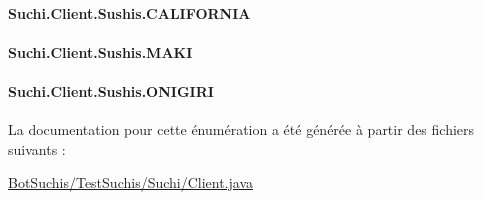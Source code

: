 \paragraph[{C\+A\+L\+I\+F\+O\+R\+N\+I\+A}]{\setlength{\rightskip}{0pt plus 5cm}Suchi.\+Client.\+Sushis.\+C\+A\+L\+I\+F\+O\+R\+N\+I\+A}\label{enumSuchi_1_1Client_1_1Sushis_a9143ca8f57e2209fed5ef8d45b45f4ed}
\hypertarget{enumSuchi_1_1Client_1_1Sushis_a7f9304fc608c42b727f2da248760fbc5}{}
\paragraph[{M\+A\+K\+I}]{\setlength{\rightskip}{0pt plus 5cm}Suchi.\+Client.\+Sushis.\+M\+A\+K\+I}\label{enumSuchi_1_1Client_1_1Sushis_a7f9304fc608c42b727f2da248760fbc5}
\hypertarget{enumSuchi_1_1Client_1_1Sushis_a5a4bebaf5f6bb0b133ded82613768474}{}
\paragraph[{O\+N\+I\+G\+I\+R\+I}]{\setlength{\rightskip}{0pt plus 5cm}Suchi.\+Client.\+Sushis.\+O\+N\+I\+G\+I\+R\+I}\label{enumSuchi_1_1Client_1_1Sushis_a5a4bebaf5f6bb0b133ded82613768474}


La documentation pour cette énumération a été générée à partir des fichiers suivants \+:\begin{DoxyCompactItemize}
\item 
\hyperlink{BotSuchis_2TestSuchis_2Suchi_2Client_8java}{Bot\+Suchis/\+Test\+Suchis/\+Suchi/\+Client.\+java}\end{DoxyCompactItemize}
